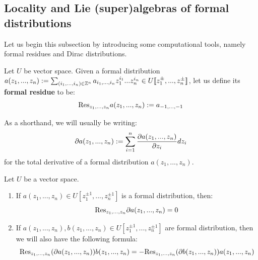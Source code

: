     \subsection{Locality and Lie (super)algebras of formal distributions}
        Let us begin this subsection by introducing some computational tools, namely formal residues and Dirac distributions.
        \begin{definition} \label{def: formal_residues}
            Let $U$ be vector space. Given a formal distribution $a(z_1, ..., z_n) := \sum_{(i_1, ..., i_n) \in \mathbb{Z}^n} a_{i_1, ..., i_n} z_1^{i_1} ... z_n^{i_n} \in U[\![z_1^{\pm}, ..., z_n^{\pm}]\!]$, let us define its \textbf{formal residue} to be:
                $$\mathrm{Res}_{z_1, ..., z_n} a(z_1, ..., z_n) := a_{-1, ..., -1}$$
        \end{definition}
        
        \begin{convention}
            As a shorthand, we will usually be writing:
                $$\partial a(z_1, ..., z_n) := \sum_{i = 1}^n \frac{\partial a(z_1, ..., z_n)}{\partial z_i} dz_i$$
            for the total derivative of a formal distribution $a(z_1, ..., z_n)$.
        \end{convention}
        \begin{lemma} \label{lemma: holomorphic_formal_distributions_and_integration_by_parts}
            Let $U$ be a vector space.
            \begin{enumerate}
                \item If $a(z_1, ..., z_n) \in U[z_1^{\pm 1}, ..., z_n^{\pm 1}]$ is a formal distribution, then:
                    $$\mathrm{Res}_{z_1, ..., z_n} \partial a(z_1, ..., z_n) = 0$$
                \item If $a(z_1, ..., z_n), b(z_1, ..., z_n) \in U[z_1^{\pm 1}, ..., z_n^{\pm 1}]$ are formal distribution, then we will also have the following  formula:
                    $$\mathrm{Res}_{z_1, ..., z_n} (\partial a(z_1, ..., z_n)) b(z_1, ..., z_n) = -\mathrm{Res}_{z_1, ..., z_n} (\partial b(z_1, ..., z_n)) a(z_1, ..., z_n)$$
            \end{enumerate}
        \end{lemma}

